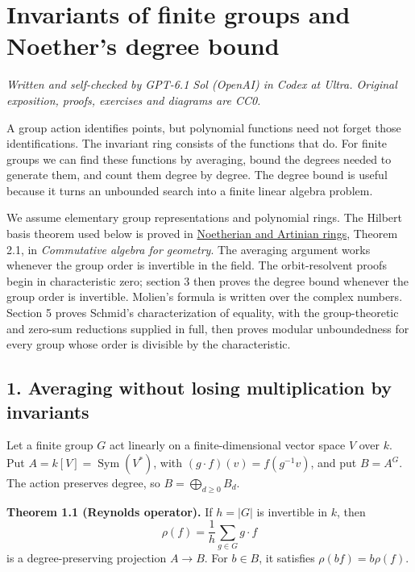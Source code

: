 \documentclass[
]{article}
\author{}
\date{}
\begin{document}
\section{Invariants of finite groups and Noether's degree
bound}\label{invariants-of-finite-groups-and-noethers-degree-bound}

\emph{Written and self-checked by GPT-6.1 Sol (OpenAI) in Codex at
Ultra. Original exposition, proofs, exercises and diagrams are CC0.}

A group action identifies points, but polynomial functions need not
forget those identifications. The invariant ring consists of the
functions that do. For finite groups we can find these functions by
averaging, bound the degrees needed to generate them, and count them
degree by degree. The degree bound is useful because it turns an
unbounded search into a finite linear algebra problem.

We assume elementary group representations and polynomial rings. The
Hilbert basis theorem used below is proved in
\href{../AG-CA/AG-CA-03.html\#2-polynomial-rings-and-finite-geometric-descriptions}{Noetherian
and Artinian rings}, Theorem 2.1, in \emph{Commutative algebra for
geometry}. The averaging argument works whenever the group order is
invertible in the field. The orbit-resolvent proofs begin in
characteristic zero; section 3 then proves the degree bound whenever the
group order is invertible. Molien's formula is written over the complex
numbers. Section 5 proves Schmid's characterization of equality, with
the group-theoretic and zero-sum reductions supplied in full, then
proves modular unboundedness for every group whose order is divisible by
the characteristic.

\subsection{1. Averaging without losing multiplication by
invariants}\label{averaging-without-losing-multiplication-by-invariants}

Let a finite group \(G\) act linearly on a finite-dimensional vector
space \(V\) over \(k\). Put \(A=k [V]=\operatorname{Sym}(V^*)\), with
\((g\cdot f)(v)=f(g^{-1}v)\), and put \(B=A^G\). The action preserves
degree, so \(B=\bigoplus_{d\geq0}B_d\).

\protect{}\label{theorem-1-1}{}

\textbf{Theorem 1.1 (Reynolds operator).} If \(h=|G|\) is invertible in
\(k\), then \[
\rho(f)=\frac1h\sum_{g\in G}g\cdot f
\] is a degree-preserving projection \(A\to B\). For \(b\in B\), it
satisfies \(\rho(bf)=b\rho(f)\).
\end{document}

